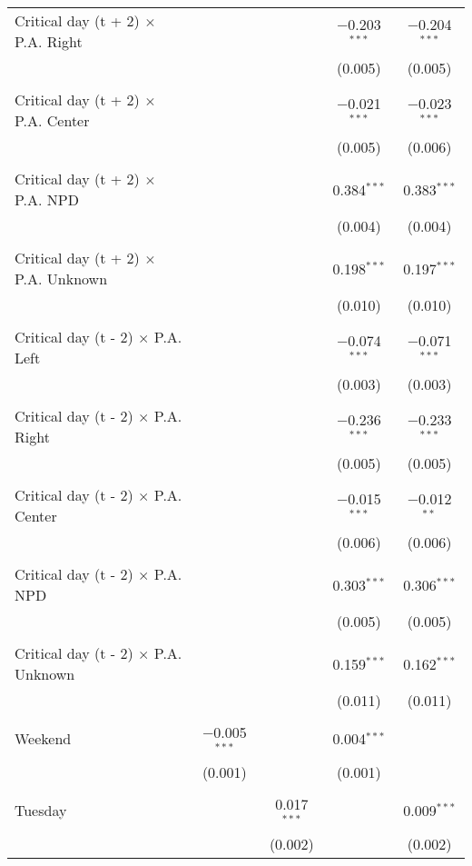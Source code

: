 \documentclass[
]{article}
\begin{document}
\begin{table}[!htbp]
{\begin{tabular}{@{\extracolsep{5pt}}lcccc}
 Critical day (t + 2) $\times$ P.A. Right &  &  & $-$0.203$^{***}$ & $-$0.204$^{***}$ \\ 
  &  &  & (0.005) & (0.005) \\ 
  & & & & \\ 
 Critical day (t + 2) $\times$ P.A. Center &  &  & $-$0.021$^{***}$ & $-$0.023$^{***}$ \\ 
  &  &  & (0.005) & (0.006) \\ 
  & & & & \\ 
 Critical day (t + 2) $\times$ P.A. NPD &  &  & 0.384$^{***}$ & 0.383$^{***}$ \\ 
  &  &  & (0.004) & (0.004) \\ 
  & & & & \\ 
 Critical day (t + 2) $\times$ P.A. Unknown &  &  & 0.198$^{***}$ & 0.197$^{***}$ \\ 
  &  &  & (0.010) & (0.010) \\ 
  & & & & \\ 
 Critical day (t - 2) $\times$ P.A. Left &  &  & $-$0.074$^{***}$ & $-$0.071$^{***}$ \\ 
  &  &  & (0.003) & (0.003) \\ 
  & & & & \\ 
 Critical day (t - 2) $\times$ P.A. Right &  &  & $-$0.236$^{***}$ & $-$0.233$^{***}$ \\ 
  &  &  & (0.005) & (0.005) \\ 
  & & & & \\ 
 Critical day (t - 2) $\times$ P.A. Center &  &  & $-$0.015$^{***}$ & $-$0.012$^{**}$ \\ 
  &  &  & (0.006) & (0.006) \\ 
  & & & & \\ 
 Critical day (t - 2) $\times$ P.A. NPD &  &  & 0.303$^{***}$ & 0.306$^{***}$ \\ 
  &  &  & (0.005) & (0.005) \\ 
  & & & & \\ 
 Critical day (t - 2) $\times$ P.A. Unknown &  &  & 0.159$^{***}$ & 0.162$^{***}$ \\ 
  &  &  & (0.011) & (0.011) \\ 
  & & & & \\ 
 Weekend & $-$0.005$^{***}$ &  & 0.004$^{***}$ &  \\ 
  & (0.001) &  & (0.001) &  \\ 
  & & & & \\ 
 Tuesday &  & 0.017$^{***}$ &  & 0.009$^{***}$ \\ 
  &  & (0.002) &  & (0.002) \\ 

\end{tabular}}
\end{table}
\end{document}
